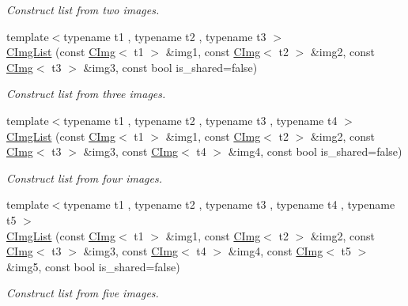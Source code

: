 \begin{DoxyCompactItemize}
\begin{DoxyCompactList}\small\item\em Construct list from two images. \end{DoxyCompactList}\item 
{\footnotesize template$<$typename t1 , typename t2 , typename t3 $>$ }\\\hyperlink{structcimg__library__suffixed_1_1CImgList_a67b3c58382dc97f481e5486a917a02f9}{C\+Img\+List} (const \hyperlink{structcimg__library__suffixed_1_1CImg}{C\+Img}$<$ t1 $>$ \&img1, const \hyperlink{structcimg__library__suffixed_1_1CImg}{C\+Img}$<$ t2 $>$ \&img2, const \hyperlink{structcimg__library__suffixed_1_1CImg}{C\+Img}$<$ t3 $>$ \&img3, const bool is\+\_\+shared=false)
\begin{DoxyCompactList}\small\item\em Construct list from three images. \end{DoxyCompactList}\item 
{\footnotesize template$<$typename t1 , typename t2 , typename t3 , typename t4 $>$ }\\\hyperlink{structcimg__library__suffixed_1_1CImgList_a416ff5e1f86b92676d711abacc1f7214}{C\+Img\+List} (const \hyperlink{structcimg__library__suffixed_1_1CImg}{C\+Img}$<$ t1 $>$ \&img1, const \hyperlink{structcimg__library__suffixed_1_1CImg}{C\+Img}$<$ t2 $>$ \&img2, const \hyperlink{structcimg__library__suffixed_1_1CImg}{C\+Img}$<$ t3 $>$ \&img3, const \hyperlink{structcimg__library__suffixed_1_1CImg}{C\+Img}$<$ t4 $>$ \&img4, const bool is\+\_\+shared=false)
\begin{DoxyCompactList}\small\item\em Construct list from four images. \end{DoxyCompactList}\item 
{\footnotesize template$<$typename t1 , typename t2 , typename t3 , typename t4 , typename t5 $>$ }\\\hyperlink{structcimg__library__suffixed_1_1CImgList_a8be35c4113a6604dfdfd4738019bc12a}{C\+Img\+List} (const \hyperlink{structcimg__library__suffixed_1_1CImg}{C\+Img}$<$ t1 $>$ \&img1, const \hyperlink{structcimg__library__suffixed_1_1CImg}{C\+Img}$<$ t2 $>$ \&img2, const \hyperlink{structcimg__library__suffixed_1_1CImg}{C\+Img}$<$ t3 $>$ \&img3, const \hyperlink{structcimg__library__suffixed_1_1CImg}{C\+Img}$<$ t4 $>$ \&img4, const \hyperlink{structcimg__library__suffixed_1_1CImg}{C\+Img}$<$ t5 $>$ \&img5, const bool is\+\_\+shared=false)
\begin{DoxyCompactList}\small\item\em Construct list from five images. \end{DoxyCompactList}\item 

\end{DoxyCompactItemize}

